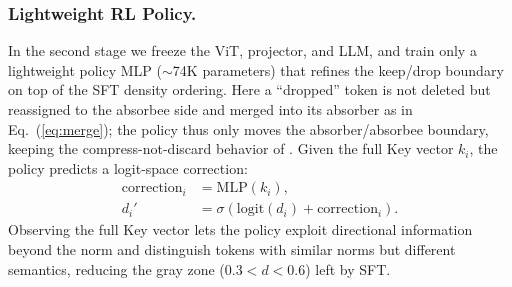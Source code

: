 \subsubsection{Lightweight RL Policy.}
In the second stage we freeze the ViT, projector, and LLM, and train only a lightweight policy MLP ($\sim$74K parameters) that refines the keep/drop boundary on top of the SFT density ordering. Here a ``dropped'' token is not deleted but reassigned to the absorbee side and merged into its absorber as in Eq.~(\ref{eq:merge}); the policy thus only moves the absorber/absorbee boundary, keeping the compress-not-discard behavior of \ours{}. Given the full Key vector $k_i$, the policy predicts a logit-space correction:
\begin{equation}
\begin{aligned}
\mathrm{correction}_i&=\mathrm{MLP}(k_i),\\
d_i'&=\sigma\!\left(\mathrm{logit}(d_i)+\mathrm{correction}_i\right).
\end{aligned}
\end{equation}
Observing the full Key vector lets the policy exploit directional information beyond the norm and distinguish tokens with similar norms but different semantics, reducing the gray zone ($0.3<d<0.6$) left by SFT.

